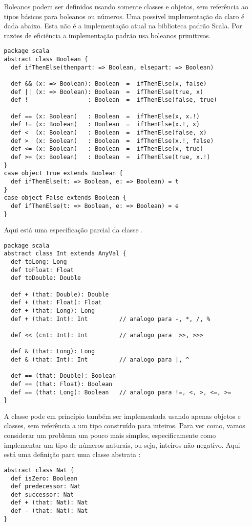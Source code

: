 Boleanos podem ser definidos usando somente classes e objetos, sem
refer\^{e}ncia ao tipos b\'{a}sicos para boleanos ou n\'{u}meros. Uma poss\'{i}vel 
implementa\c{c}\~{a}o da claro  \'{e} dada abaixo. Esta n\~{a}o \'{e} 
a implementa\c{c}\~{a}o atual na biblioteca padr\~{a}o Scala. Por raz\~{o}es de 
efici\^{e}ncia a implementa\c{c}\~{a}o padr\~{a}o usa boleanos primitivos.
\begin{lstlisting}
package scala
abstract class Boolean {
  def ifThenElse(thenpart: => Boolean, elsepart: => Boolean)

  def && (x: => Boolean): Boolean  =  ifThenElse(x, false)
  def || (x: => Boolean): Boolean  =  ifThenElse(true, x)
  def !                 : Boolean  =  ifThenElse(false, true)

  def == (x: Boolean)   : Boolean  =  ifThenElse(x, x.!)
  def != (x: Boolean)   : Boolean  =  ifThenElse(x.!, x)
  def <  (x: Boolean)   : Boolean  =  ifThenElse(false, x)
  def >  (x: Boolean)   : Boolean  =  ifThenElse(x.!, false)
  def <= (x: Boolean)   : Boolean  =  ifThenElse(x, true)
  def >= (x: Boolean)   : Boolean  =  ifThenElse(true, x.!)
}
case object True extends Boolean {
  def ifThenElse(t: => Boolean, e: => Boolean) = t
}
case object False extends Boolean {
  def ifThenElse(t: => Boolean, e: => Boolean) = e
}
\end{lstlisting}

Aqui est\'{a} uma especifica\c{c}\~{a}o parcial da classe .
\begin{lstlisting}
package scala
abstract class Int extends AnyVal {
  def toLong: Long
  def toFloat: Float
  def toDouble: Double

  def + (that: Double): Double
  def + (that: Float): Float
  def + (that: Long): Long
  def + (that: Int): Int         // analogo para -, *, /, %

  def << (cnt: Int): Int         // analogo para  >>, >>>

  def & (that: Long): Long
  def & (that: Int): Int         // analogo para |, ^

  def == (that: Double): Boolean
  def == (that: Float): Boolean
  def == (that: Long): Boolean   // analogo para !=, <, >, <=, >=
}
\end{lstlisting}

A classe  pode em princ\'{i}pio tamb\'{e}m ser implementada usando
apenas objetos e classes, sem refer\^{e}ncia a um tipo constru\'{i}do para 
inteiros. Para ver como, vamos considerar um problema um pouco mais 
simples, especificamente como implementar um tipo  de 
n\'{u}meros naturais, ou seja, inteiros n\~{a}o negativo. Aqui est\'{a} uma defini\c{c}\~{a}o 
para uma classe abstrata :
\begin{lstlisting}
abstract class Nat {
  def isZero: Boolean
  def predecessor: Nat
  def successor: Nat
  def + (that: Nat): Nat
  def - (that: Nat): Nat
}
\end{lstlisting}

